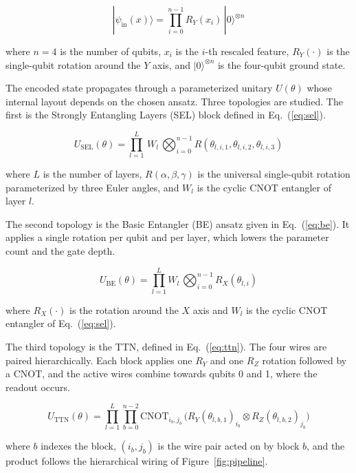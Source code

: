 \documentclass[conference]{IEEEtran}
\begin{document}
\begin{equation}
|\psi_{\text{in}}(x)\rangle = \prod_{i=0}^{n-1} R_Y(x_i)\,|0\rangle^{\otimes n}
\label{eq:embed}
\end{equation}

where $n=4$ is the number of qubits, $x_i$ is the $i$-th rescaled feature, $R_Y(\cdot)$ is the single-qubit rotation around the $Y$ axis, and $|0\rangle^{\otimes n}$ is the four-qubit ground state.

The encoded state propagates through a parameterized unitary $U(\theta)$ whose internal layout depends on the chosen ansatz. Three topologies are studied. The first is the Strongly Entangling Layers (SEL) block defined in Eq.~(\ref{eq:sel}).

\begin{equation}
U_{\text{SEL}}(\theta) = \prod_{l=1}^{L}\, W_l\,\bigotimes_{i=0}^{n-1} R(\theta_{l,i,1},\theta_{l,i,2},\theta_{l,i,3})
\label{eq:sel}
\end{equation}

where $L$ is the number of layers, $R(\alpha,\beta,\gamma)$ is the universal single-qubit rotation parameterized by three Euler angles, and $W_l$ is the cyclic CNOT entangler of layer $l$.

The second topology is the Basic Entangler (BE) ansatz given in Eq.~(\ref{eq:be}). It applies a single rotation per qubit and per layer, which lowers the parameter count and the gate depth.

\begin{equation}
U_{\text{BE}}(\theta) = \prod_{l=1}^{L} W_l \,\bigotimes_{i=0}^{n-1} R_X(\theta_{l,i})
\label{eq:be}
\end{equation}

where $R_X(\cdot)$ is the rotation around the $X$ axis and $W_l$ is the cyclic CNOT entangler of Eq.~(\ref{eq:sel}).

The third topology is the TTN, defined in Eq.~(\ref{eq:ttn}). The four wires are paired hierarchically. Each block applies one $R_Y$ and one $R_Z$ rotation followed by a CNOT, and the active wires combine towards qubits 0 and 1, where the readout occurs.

\begin{equation}
U_{\text{TTN}}(\theta) = \prod_{l=1}^{L} \prod_{b=0}^{n-2} \mathrm{CNOT}_{i_b,j_b}\,\bigl(R_Y(\theta_{l,b,1})_{i_b}\otimes R_Z(\theta_{l,b,2})_{j_b}\bigr)
\label{eq:ttn}
\end{equation}

where $b$ indexes the block, $(i_b,j_b)$ is the wire pair acted on by block $b$, and the product follows the hierarchical wiring of Figure~\ref{fig:pipeline}.
\end{document}
